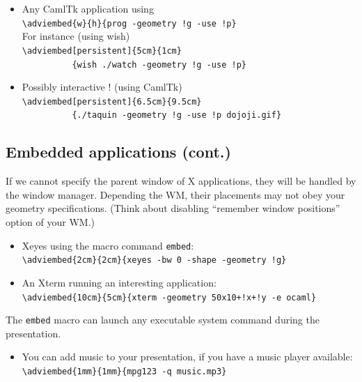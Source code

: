 \documentclass[12pt]{article}
\begin{document}
\begin{itemize}
  \item Any CamlTk application using\\
   \verb+\adviembed{w}{h}{prog -geometry !g -use !p}+\\
   For instance (using wish)\\
   \verb|\adviembed[persistent]{5cm}{1cm}|\\
   \verb|          {wish ./watch -geometry !g -use !p}|\\
\adviwait
  \item Possibly interactive ! (using CamlTk)\\
   \verb|\adviembed[persistent]{6.5cm}{9.5cm}|\\
   \verb|          {./taquin -geometry !g -use !p dojoji.gif}|\\

\end{itemize}


\newpage

\subsection* {Embedded applications (cont.)}

If we cannot specify the parent window of X applications,
they will be handled by the window manager.
Depending the WM, 
their placements may not obey your geometry specifications.
(Think about disabling ``remember window positions'' option of your WM.)

\begin{itemize}
 \item Xeyes using the macro command \verb|embed|:\\
   \verb|\adviembed{2cm}{2cm}{xeyes -bw 0 -shape -geometry !g}|\\

 \item An Xterm running an interesting application:\\
   \verb|\adviembed{10cm}{5cm}{xterm -geometry 50x10+!x+!y -e ocaml}|\\
\end{itemize}

The \verb|embed| macro can launch any executable system command during
the presentation.
\begin{itemize}
 \item You can add music to your presentation, if you have a music
  player available:\\
  \verb|\adviembed{1mm}{1mm}{mpg123 -q music.mp3}|
\end{itemize}
\end{document}
